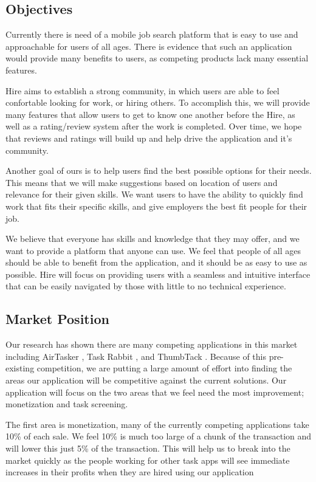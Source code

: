 \documentclass[11pt]{article}
\begin{document}
\subsection{Objectives}

Currently there is need of a mobile job search platform that is easy to use and approachable for users of all ages. There is evidence that such an application would provide many benefits to users, as competing products lack many essential features.

Hire aims to establish a strong community, in which users are able to feel confortable looking for work, or hiring others. To accomplish this, we will provide many features that allow users to get to know one another before the Hire, as well as a rating/review system after the work is completed. Over time, we hope that reviews and ratings will build up and help drive the application and it's community.

Another goal of ours is to help users find the best possible options for their needs. This means that we will make suggestions based on location of users and relevance for their given skills. We want users to have the ability to quickly find work that fits their specific skills, and give employers the best fit people for their job.

We believe that everyone has skills and knowledge that they may offer, and we want to provide a platform that anyone can use. We feel that people of all ages should be able to benefit from the application, and it should be as easy to use as possible. Hire will focus on providing users with a seamless and intuitive interface that can be easily navigated by those with little to no technical experience.

\subsection{Market Position}

Our research has shown there are many competing applications in this market including AirTasker \cite{AirTasker}, Task Rabbit \cite{TaskRabbit}, and ThumbTack \cite{ThumbTack}. 
Because of this pre-existing competition, we are putting a large amount of effort into finding the areas our application will be competitive against the current solutions. 
Our application will focus on the two areas that we feel need the most improvement; monetization and task screening.

The first area is monetization, many of the currently competing applications take 10\% of each sale. 
We feel 10\% is much too large of a chunk of the transaction and will lower this just 5\% of the transaction. 
This will help us to break into the market quickly as the people working for other task apps will see immediate increases in their profits when they are hired using our application
\end{document}

